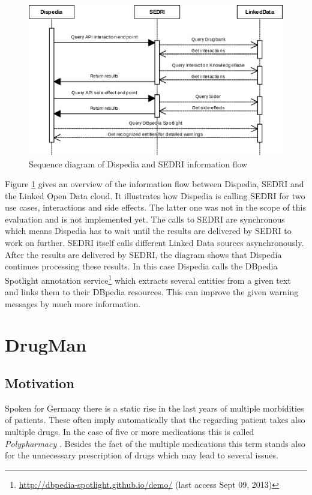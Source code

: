 \begin{figure}
  \centering
  \includegraphics[width=\textwidth]{evaluation/LODD_Wrapper_Sequences.eps}
  \caption{Sequence diagram of Dispedia and SEDRI information flow}
  \label{fig:dispedia_sequence}
\end{figure}
Figure \ref{fig:dispedia_sequence} gives an overview of the information flow between Dispedia, SEDRI and the Linked Open Data cloud.
It illustrates how Dispedia is calling SEDRI for two use cases, interactions and side effects.
The latter one was not in the scope of this evaluation and is not implemented yet.
The calls to SEDRI are synchronous which means Dispedia has to wait until the results are delivered by SEDRI to work on further.
SEDRI itself calls different Linked Data sources asynchronously.
After the results are delivered by SEDRI, the diagram shows that Dispedia continues processing these results.
In this case Dispedia calls the DBpedia Spotlight annotation service\footnote{\url{http://dbpedia-spotlight.github.io/demo/} (last access Sept 09, 2013)} which extracts several entities from a given text and links them to their DBpedia resources.
This can improve the given warning messages by much more information.

\section{DrugMan}
\label{sec:portal}

\subsection{Motivation}
\label{sec-1}

Spoken for Germany there is a static rise in the last years of multiple morbidities of patients.
These often imply automatically that the regarding patient takes also multiple drugs.
In the case of five or more medications this is called \textit{Polypharmacy} \cite{montamat1992overcoming}.
Besides the fact of the multiple medications this term stands also for the unnecessary prescription of drugs which may lead to several issues.

